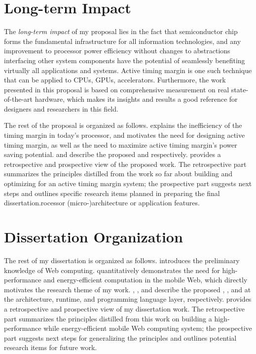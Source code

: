 \section{Long-term Impact}
\label{sec:intro:impact}

The \textit{long-term impact} of my proposal lies in the fact that semiconductor chip forms the fundamental infrastructure for all information technologies, and any improvement to processor power efficiency without changes to abstractions interfacing other system components have the potential of seamlessly benefiting virtually all applications and systems. Active timing margin is one such technique that can be applied to CPUs, GPUs, accelerators. Furthermore, the work presented in this proposal is based on comprehensive measurement on real state-of-the-art hardware, which makes its insights and results a good reference for designers and researchers in this field.

The rest of the proposal is organized as follows.  explains the inefficiency of the timing margin in today's processor, and motivates the need for designing active timing margin, as well as the need to maximize active timing margin's power saving potential.  and describe the proposed \tistates and \ams respectively.  provides a retrospective and prospective view of the proposed work. The retrospective part summarizes the principles distilled from the work so far about building and optimizing for an active timing margin system; the prospective part suggests next steps and outlines specific research items planned in preparing the final dissertation.rocessor (micro-)architecture or application features.

\section{Dissertation Organization}
\label{sec:intro:outline}

The rest of my dissertation is organized as follows.  introduces the preliminary knowledge of Web computing.  quantitatively demonstrates the need for high-performance and energy-efficient computation in the mobile Web, which directly motivates the research theme of my work. , , and  describe the proposed \webcore, \webrt, and \greenweb at the architecture, runtime, and programming language layer, respectively.  provides a retrospective and prospective view of my dissertation work. The retrospective part summarizes the principles distilled from this work on building a high-performance while energy-efficient mobile Web computing system; the prospective part suggests next steps for generalizing the principles and outlines potential research items for future work.

